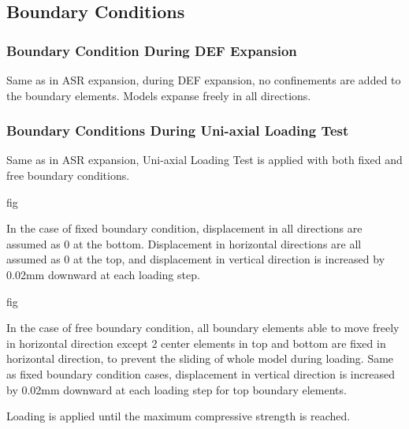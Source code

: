 \subsection{Boundary Conditions}

\subsubsection{Boundary Condition During DEF Expansion}

Same as in ASR expansion, during DEF expansion, no confinements are added to the boundary elements. Models expanse freely in all directions.

\subsubsection{Boundary Conditions During Uni-axial Loading Test}

Same as in ASR expansion, Uni-axial Loading Test is applied with both fixed and free boundary conditions.

fig

In the case of fixed boundary condition, displacement in all directions are assumed as 0 at the bottom. Displacement in horizontal directions are all assumed as 0 at the top, and displacement in vertical direction is increased by 0.02mm downward at each loading step.

fig

In the case of free boundary condition, all boundary elements able to move freely in horizontal direction except 2 center elements in top and bottom are fixed in horizontal direction, to prevent the sliding of whole model during loading. Same as fixed boundary condition cases, displacement in vertical direction is increased by 0.02mm downward at each loading step for top boundary elements.

Loading is applied until the maximum compressive strength is reached.
